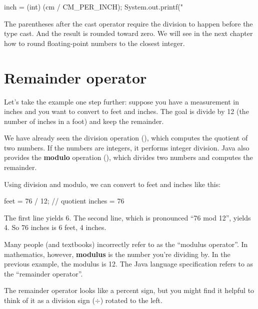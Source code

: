 \begin{code}
inch = (int) (cm / CM_PER_INCH);
System.out.printf("%
\end{code}

The parentheses after the cast operator require the division to happen before the type cast.
And the result is rounded toward zero.
We will see in the next chapter how to round floating-point numbers to the closest integer.


\section{Remainder operator}

Let's take the example one step further: suppose you have a measurement in inches and you want to convert to feet and inches.
The goal is divide by 12 (the number of inches in a foot) and keep the remainder.


We have already seen the division operation (\java{/}), which computes the quotient of two numbers.
If the numbers are integers, it performs integer division.
Java also provides the {\bf modulo} operation (\java{\%}), which divides two numbers and computes the remainder.

Using division and modulo, we can convert to feet and inches like this:

\begin{code}
feet = 76 / 12;    // quotient
inches = 76 %
\end{code}

The first line yields 6.
The second line, which is pronounced ``76 mod 12'', yields 4.
So 76 inches is 6 feet, 4 inches.

Many people (and textbooks) incorrectly refer to \java{\%} as the ``modulus operator''.
In mathematics, however, {\bf modulus} is the number you're dividing by.
In the previous example, the modulus is 12.
The Java language specification refers to  \java{\%} as the ``remainder operator''.

The remainder operator looks like a percent sign, but you might find it helpful to think of it as a division sign ($\div$) rotated to the left.


